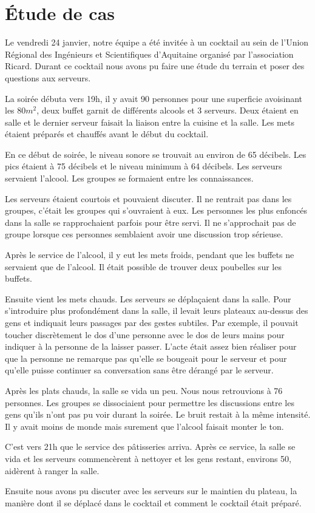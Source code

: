 \section*{\'Etude de cas}
Le vendredi 24 janvier, notre équipe a été invitée à un cocktail au sein de l’Union Régional des Ingénieurs et Scientifiques d’Aquitaine organisé par l’association Ricard. Durant ce cocktail nous avons pu faire une étude du terrain et poser des questions aux serveurs.

La soirée débuta vers 19h, il y avait 90 personnes pour une superficie avoisinant les $80m^2$, deux buffet garnit de différents alcools et 3 serveurs. Deux étaient en salle et le dernier serveur faisait la liaison entre la cuisine et la salle. Les mets étaient préparés et chauffés avant le début du cocktail.

En ce début de soirée, le niveau sonore se trouvait au environ de 65 décibels. Les pics étaient à 75 décibels et le niveau minimum à 64 décibels. Les serveurs servaient l’alcool. Les groupes se formaient entre les connaissances.

Les serveurs étaient courtois et pouvaient discuter. Il ne rentrait pas dans les groupes, c’était les groupes qui s’ouvraient à eux. Les personnes les plus enfoncés dans la salle se rapprochaient parfois pour être servi. Il ne s’approchait pas de groupe lorsque ces personnes semblaient avoir une discussion trop sérieuse.

Après le service de l’alcool, il y eut les mets froids, pendant que les buffets ne servaient que de l’alcool. Il était possible de trouver deux poubelles sur les buffets.

Ensuite vient les mets chauds. Les serveurs se déplaçaient dans la salle. Pour s’introduire plus profondément dans la salle, il levait leurs plateaux au-dessus des gens et  indiquait leurs passages par des gestes subtiles. Par exemple, il pouvait toucher discrètement le dos d’une personne avec le dos de leurs mains pour indiquer à la personne de la laisser passer. L’acte était assez bien réaliser pour que la personne ne remarque pas qu’elle se bougeait pour le serveur et pour qu’elle puisse continuer sa conversation sans être dérangé par le serveur.

Après les plats chauds, la salle se vida un peu. Nous nous retrouvions à 76 personnes. Les groupes se dissociaient pour permettre les discussions entre les gens qu’ils n’ont pas pu voir durant la soirée. Le bruit restait à la même intensité. Il y avait moins de monde mais surement que l’alcool faisait monter le ton.

C’est vers 21h que le service des pâtisseries arriva. Après ce service, la salle se vida et les serveurs commencèrent à nettoyer et les gens restant, environs 50, aidèrent à ranger la salle.

Ensuite nous avons pu discuter avec les serveurs sur le maintien du plateau, la manière dont il se déplacé dans le cocktail et comment le cocktail était préparé. 
